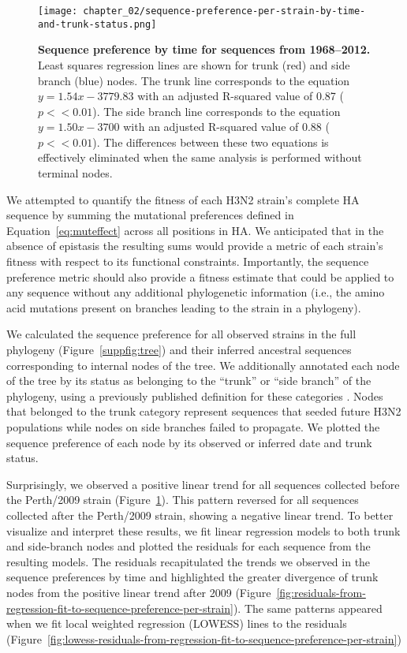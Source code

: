 \begin{figure}
  \centering
  \texttt{[image: chapter\_02/sequence-preference-per-strain-by-time-and-trunk-status.png]}
  \caption[{Sequence preference by time for sequences from 1968--2012.}]{\label{fig:sequence-preference-per-strain} {\bf Sequence preference by time for sequences from 1968--2012.}
    Least squares regression lines are shown for trunk (red) and side branch (blue) nodes.
    The trunk line corresponds to the equation $y = 1.54x - 3779.83$ with an adjusted R-squared value of 0.87 ($p << 0.01$).
    The side branch line corresponds to the equation $y = 1.50x - 3700$ with an adjusted R-squared value of 0.88 ($p << 0.01$).
    The differences between these two equations is effectively eliminated when the same analysis is performed without terminal nodes.}
\end{figure}

We attempted to quantify the fitness of each H3N2 strain's complete HA sequence by summing the mutational preferences defined in Equation~\ref{eq:muteffect} across all positions in HA.
We anticipated that in the absence of epistasis the resulting sums would provide a metric of each strain's fitness with respect to its functional constraints.
Importantly, the sequence preference metric should also provide a fitness estimate that could be applied to any sequence without any additional phylogenetic information (i.e., the amino acid mutations present on branches leading to the strain in a phylogeny).

We calculated the sequence preference for all observed strains in the full phylogeny (Figure~\ref{suppfig:tree}) and their inferred ancestral sequences corresponding to internal nodes of the tree.
We additionally annotated each node of the tree by its status as belonging to the ``trunk'' or ``side branch'' of the phylogeny, using a previously published definition for these categories \citep{Bedford:2015fj}.
Nodes that belonged to the trunk category represent sequences that seeded future H3N2 populations while nodes on side branches failed to propagate.
We plotted the sequence preference of each node by its observed or inferred date and trunk status.

Surprisingly, we observed a positive linear trend for all sequences collected before the Perth/2009 strain (Figure~\ref{fig:sequence-preference-per-strain}).
This pattern reversed for all sequences collected after the Perth/2009 strain, showing a negative linear trend.
To better visualize and interpret these results, we fit linear regression models to both trunk and side-branch nodes and plotted the residuals for each sequence from the resulting models.
The residuals recapitulated the trends we observed in the sequence preferences by time and highlighted the greater divergence of trunk nodes from the positive linear trend after 2009 (Figure~\ref{fig:residuals-from-regression-fit-to-sequence-preference-per-strain}).
The same patterns appeared when we fit local weighted regression (LOWESS) lines to the residuals (Figure~\ref{fig:lowess-residuals-from-regression-fit-to-sequence-preference-per-strain})

